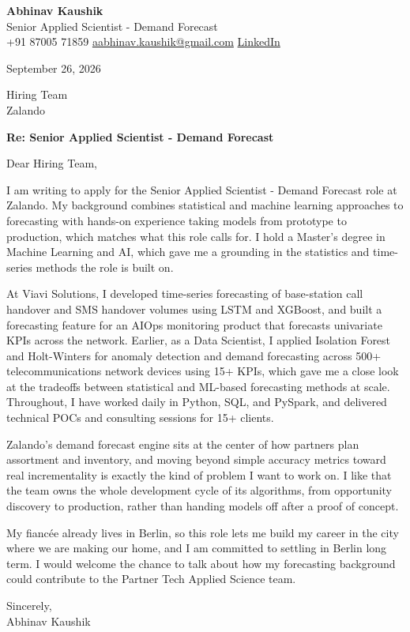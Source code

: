 \documentclass[11pt,a4paper]{article}
\begin{document}
{\Large\bfseries Abhinav Kaushik}\\
Senior Applied Scientist - Demand Forecast\\
+91 87005 71859 \textbar{} \href{mailto:aabhinav.kaushik@gmail.com}{aabhinav.kaushik@gmail.com} \textbar{} \href{https://linkedin.com/in/abhinav-kaushik10/}{LinkedIn}  

September 26, 2026

Hiring Team\\
Zalando

\textbf{Re: Senior Applied Scientist - Demand Forecast}

Dear Hiring Team,

I am writing to apply for the Senior Applied Scientist - Demand Forecast role at Zalando. My background combines statistical and machine learning approaches to forecasting with hands-on experience taking models from prototype to production, which matches what this role calls for. I hold a Master's degree in Machine Learning and AI, which gave me a grounding in the statistics and time-series methods the role is built on.

At Viavi Solutions, I developed time-series forecasting of base-station call handover and SMS handover volumes using LSTM and XGBoost, and built a forecasting feature for an AIOps monitoring product that forecasts univariate KPIs across the network. Earlier, as a Data Scientist, I applied Isolation Forest and Holt-Winters for anomaly detection and demand forecasting across 500+ telecommunications network devices using 15+ KPIs, which gave me a close look at the tradeoffs between statistical and ML-based forecasting methods at scale. Throughout, I have worked daily in Python, SQL, and PySpark, and delivered technical POCs and consulting sessions for 15+ clients.

Zalando's demand forecast engine sits at the center of how partners plan assortment and inventory, and moving beyond simple accuracy metrics toward real incrementality is exactly the kind of problem I want to work on. I like that the team owns the whole development cycle of its algorithms, from opportunity discovery to production, rather than handing models off after a proof of concept.

My fiancée already lives in Berlin, so this role lets me build my career in the city where we are making our home, and I am committed to settling in Berlin long term. I would welcome the chance to talk about how my forecasting background could contribute to the Partner Tech Applied Science team.

Sincerely,\\[4pt]
Abhinav Kaushik
\end{document}
